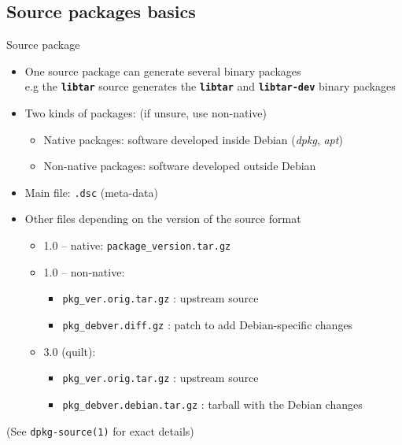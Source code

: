 \documentclass[10pt,final]{beamer}
\begin{document}
\subsection{Source packages basics}
\begin{frame}{Source package}
  \begin{itemize}
  \item One source package can generate several binary packages\\
    {\small e.g the \texttt{\bfseries libtar} source generates the
      \texttt{\bfseries libtar} and \texttt{\bfseries libtar-dev} binary
      packages} \hbr
  \item Two kinds of packages: (if unsure, use non-native)
    \begin{itemize}
      \small
    \item Native packages: software developed inside Debian (\textsl{dpkg}, \textsl{apt})
    \item Non-native packages: software developed outside Debian
    \end{itemize}
    \hbr
  \item Main file: \texttt{.dsc} (meta-data)
    \hbr
  \item Other files depending on the version of the source format
    \begin{itemize}
    \item 1.0 -- native: \texttt{package\_version.tar.gz}
      \hbr
    \item 1.0 -- non-native:
      \begin{itemize}
      \item \texttt{pkg\_ver.orig.tar.gz} : upstream source
      \item \texttt{pkg\_debver.diff.gz} : patch to add Debian-specific changes
      \end{itemize}
      \hbr
    \item 3.0 (quilt):
      \begin{itemize}
      \item \texttt{pkg\_ver.orig.tar.gz} : upstream source
      \item \texttt{pkg\_debver.debian.tar.gz} : tarball with the Debian changes
      \end{itemize}
    \end{itemize}
  \end{itemize}
  \br
  (See \texttt{dpkg-source(1)} for exact details)
\end{frame}
\end{document}
